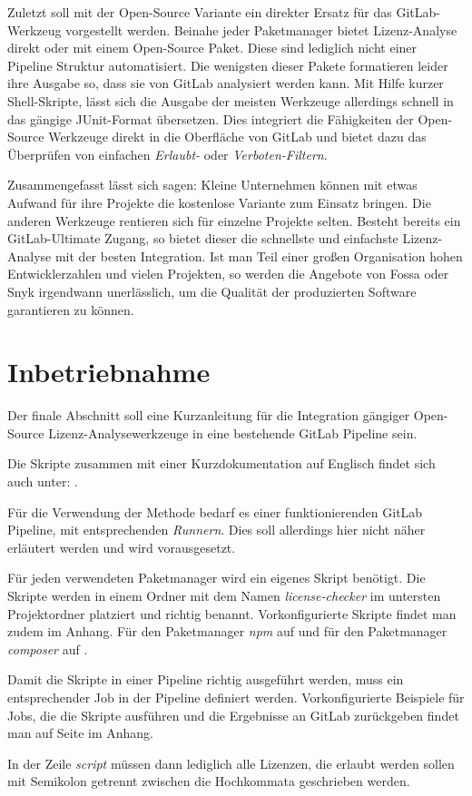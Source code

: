 Zuletzt soll mit der Open-Source Variante ein direkter Ersatz für das GitLab-Werkzeug vorgestellt werden. 
Beinahe jeder Paketmanager bietet Lizenz-Analyse direkt oder mit einem Open-Source Paket. Diese sind lediglich nicht einer Pipeline Struktur automatisiert. 
Die wenigsten dieser Pakete formatieren leider ihre Ausgabe so, dass sie von GitLab analysiert werden kann. Mit Hilfe kurzer Shell-Skripte, lässt sich die Ausgabe der meisten Werkzeuge allerdings schnell in das gängige JUnit-Format \cite{ibmJUnitStandard} übersetzen. Dies integriert die Fähigkeiten der Open-Source Werkzeuge direkt in die Oberfläche von GitLab und bietet dazu das Überprüfen von einfachen \emph{Erlaubt-} oder \emph{Verboten-Filtern}.

Zusammengefasst lässt sich sagen: Kleine Unternehmen können mit etwas Aufwand für ihre Projekte die kostenlose Variante zum Einsatz bringen. Die anderen Werkzeuge rentieren sich für einzelne Projekte selten. Besteht bereits ein GitLab-Ultimate Zugang, so bietet dieser die schnellste und einfachste Lizenz-Analyse mit der besten Integration. Ist man Teil einer großen Organisation hohen Entwicklerzahlen und vielen Projekten, so werden die Angebote von Fossa oder Snyk irgendwann unerlässlich, um die Qualität der produzierten Software garantieren zu können.


\section{Inbetriebnahme}

Der finale Abschnitt soll eine Kurzanleitung für die Integration gängiger Open-Source Lizenz-Analysewerkzeuge in eine bestehende GitLab Pipeline sein.

Die Skripte zusammen mit einer Kurzdokumentation auf Englisch findet sich auch unter: \cite{kellOpenSourceLicenseChecker2021}. 

Für die Verwendung der Methode bedarf es einer funktionierenden GitLab Pipeline, mit entsprechenden \emph{Runnern}. Dies soll allerdings hier nicht näher erläutert werden und wird vorausgesetzt. 

Für jeden verwendeten Paketmanager wird ein eigenes Skript benötigt. Die Skripte werden in einem Ordner mit dem Namen \emph{license-checker} im untersten Projektordner platziert und richtig benannt. 
Vorkonfigurierte Skripte findet man zudem im Anhang. Für den Paketmanager \emph{npm} auf  und für den Paketmanager \emph{composer} auf . 

Damit die Skripte in einer Pipeline richtig ausgeführt werden, muss ein entsprechender Job in der Pipeline definiert werden. Vorkonfigurierte Beispiele für Jobs, die die Skripte ausführen und die Ergebnisse an GitLab zurückgeben findet man auf Seite  im Anhang.

In der Zeile \emph{script} müssen dann lediglich alle Lizenzen, die erlaubt werden sollen mit Semikolon getrennt zwischen die Hochkommata geschrieben werden.